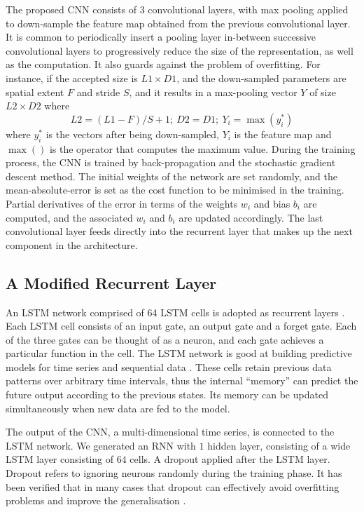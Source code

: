 \documentclass[a4paper, 10 pt, twocolumn]{IEEEtran}
\begin{document}
The proposed CNN  consists of 3 convolutional layers, with max pooling applied to down-sample the feature map obtained from the previous convolutional layer. It is common to periodically insert a pooling layer in-between
successive convolutional layers to progressively {reduce the size of the representation, as well as the computation}. It also guards against the problem of overfitting. For instance, if the accepted size is $L1 \times
D1$, and the down-sampled parameters are spatial extent $F$ and stride $S$, and it results in a max-pooling vector $Y$ of size $L2 \times D2$ where
\begin{equation}\label{eq:LD}
L2 = (L1-F)/S + 1; \ D2 = D1;  \ Y_i = \max(y_i^*)
\end{equation}
where $y_i^*$ is the vectors after being down-sampled, $Y_i$ is the feature map and $\max()$ is the operator that computes the maximum value.  During the training process, the CNN is trained by back-propagation and the
stochastic gradient descent method. The initial weights of the network are set randomly, and the mean-absolute-error is set as the cost function to be minimised in the training. Partial derivatives of the error in terms
of the weights $w_i$ and bias $b_i$ are computed, and the associated $w_i$ and $b_i$ are updated accordingly. The last convolutional layer feeds directly into the recurrent layer that makes up the next component in the
architecture.



\subsection{A Modified Recurrent Layer}

 An LSTM network comprised of 64 LSTM cells is adopted as recurrent layers \cite{Hochreiter-LongShort}. Each LSTM cell consists of an input gate, an output gate and a forget gate. Each of the three gates can be thought of
 as a neuron, and each gate achieves a particular function in the cell. The LSTM network is good at building predictive models for time series and sequential data \cite{Graves-SpeechRecognition}. These cells retain
 previous data patterns over arbitrary time intervals, thus the internal ``memory'' can predict the future output according to the previous states. Its memory  {can be} updated simultaneously when new data are fed to the
 model.

The output of the CNN, {a multi-dimensional time series, is connected to the LSTM network. We generated an RNN with $1$ hidden layer}, consisting of a wide LSTM layer consisting of $64$ cells. A dropout applied after the
LSTM layer. Dropout refers to ignoring neurons randomly during the training phase. It has been verified that in many cases that dropout can effectively avoid overfitting problems and improve the generalisation
\cite{Srivastava-DropoutASimple}.
\end{document}
